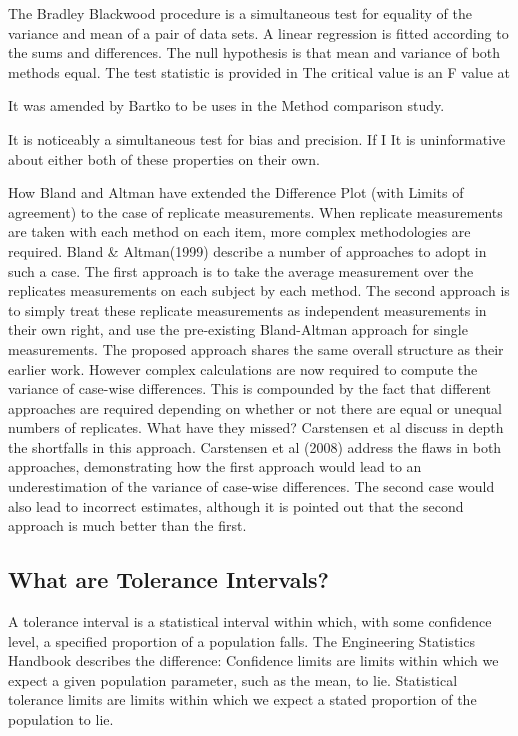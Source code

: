 The Bradley Blackwood procedure is a simultaneous test for equality of the variance and mean of a pair of data sets. 
A linear regression is fitted according to the sums and differences.
The null hypothesis is that mean and variance of both methods equal.
The test statistic is provided in 
The critical value is an F value at \alpha %





It was amended by Bartko to be uses in the Method comparison study.

It is noticeably a simultaneous test for bias and precision. If I It is uninformative about either both of these properties on their own.

\newpage
How Bland and Altman have extended the Difference Plot (with Limits of agreement) to the case of replicate measurements.
When replicate measurements are taken with each method on each item, more complex methodologies are required. Bland \& Altman(1999) describe a number of approaches to adopt in such a case. The first approach is to take the average measurement over the replicates measurements on each subject by each method.
The second approach is to simply treat these replicate measurements as independent measurements in their own right, and use the pre-existing Bland-Altman approach for single measurements.
The proposed approach shares the same overall structure as their earlier work. However complex calculations are now required to compute the variance of case-wise differences. This is compounded by the fact that different approaches are required depending on whether or not there are equal or unequal numbers of replicates.
What have they missed? Carstensen et al discuss in depth the shortfalls in this approach.
Carstensen et al (2008) address the flaws in both approaches, demonstrating how the first approach would lead to an underestimation of the variance of case-wise differences. The second case would also lead to incorrect estimates, although it is pointed out that the second approach is much better than the first.

\subsection*{What are Tolerance Intervals?}
A tolerance interval is a statistical interval within which, with some confidence level, a specified proportion of a population falls.
The Engineering Statistics Handbook describes the difference: Confidence limits are limits within which we expect a given population parameter, such as the mean, to lie. Statistical tolerance limits are limits within which we expect a stated proportion of the population to lie.

